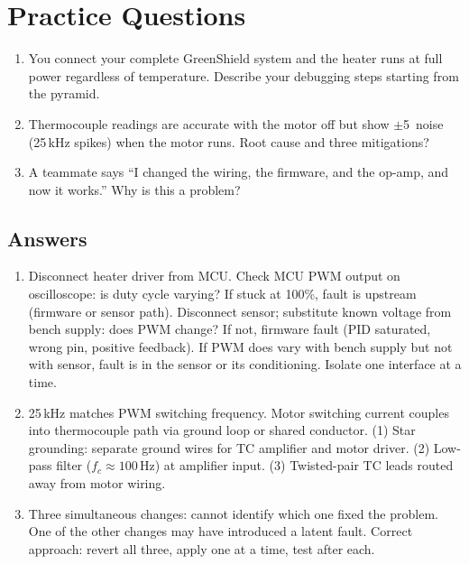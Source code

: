 \section{Practice Questions}
\begin{enumerate}[leftmargin=1.5em]
\item You connect your complete GreenShield system and the heater runs at full power regardless of temperature. Describe your debugging steps starting from the pyramid.
\item Thermocouple readings are accurate with the motor off but show $\pm$5\,\degC{} noise (25\,kHz spikes) when the motor runs. Root cause and three mitigations?
\item A teammate says ``I changed the wiring, the firmware, and the op-amp, and now it works.'' Why is this a problem?
\end{enumerate}

\subsection{Answers}
\begin{enumerate}[leftmargin=1.5em]
\item Disconnect heater driver from MCU. Check MCU PWM output on oscilloscope: is duty cycle varying? If stuck at 100\%, fault is upstream (firmware or sensor path). Disconnect sensor; substitute known voltage from bench supply: does PWM change? If not, firmware fault (PID saturated, wrong pin, positive feedback). If PWM does vary with bench supply but not with sensor, fault is in the sensor or its conditioning. Isolate one interface at a time.
\item 25\,kHz matches PWM switching frequency. Motor switching current couples into thermocouple path via ground loop or shared conductor. (1) Star grounding: separate ground wires for TC amplifier and motor driver. (2) Low-pass filter ($f_c \approx 100$\,Hz) at amplifier input. (3) Twisted-pair TC leads routed away from motor wiring.
\item Three simultaneous changes: cannot identify which one fixed the problem. One of the other changes may have introduced a latent fault. Correct approach: revert all three, apply one at a time, test after each.
\end{enumerate}


